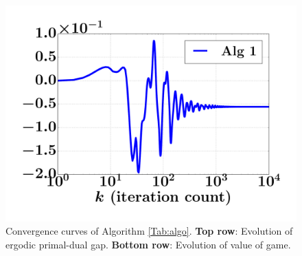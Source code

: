 \documentclass{article} %
\begin{document}
\begin{figure}[!htpb]
  \hspace{-1em}
  \includegraphics[width=.5\linewidth]{Kuhn3112_NE.pdf}
  \caption{Convergence curves of Algorithm
    \ref{Tab:algo}. \textbf{Top row}: Evolution of ergodic
    primal-dual gap. \textbf{Bottom row}: Evolution of
    value of game.}
  \label{Tab:dgap_curve}
\end{figure}
\end{document}

